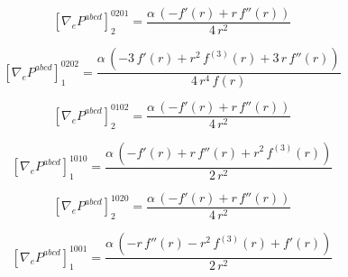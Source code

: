 \documentclass[11pt]{article}
\begin{document}
\begin{dmath*}[breakdepth={5}]
\left[\nabla_e P^{abcd}\right]_{2}^{0201} = \frac{\alpha\,\left(-f'\!\left(r\right) + r\,f''\!\left(r\right)\right)}{4\,{r}^{2}}
\end{dmath*}
\par\smallskip
\begin{dmath*}[breakdepth={5}]
\left[\nabla_e P^{abcd}\right]_{1}^{0202} = \frac{\alpha\,\left(-3\,f'\!\left(r\right) + {r}^{2}\,f^{(3)}\!\left(r\right) + 3\,r\,f''\!\left(r\right)\right)}{4\,{r}^{4}\,f\!\left(r\right)}
\end{dmath*}
\par\smallskip
\begin{dmath*}[breakdepth={5}]
\left[\nabla_e P^{abcd}\right]_{2}^{0102} = \frac{\alpha\,\left(-f'\!\left(r\right) + r\,f''\!\left(r\right)\right)}{4\,{r}^{2}}
\end{dmath*}
\par\smallskip
\begin{dmath*}[breakdepth={5}]
\left[\nabla_e P^{abcd}\right]_{1}^{1010} = \frac{\alpha\,\left(-f'\!\left(r\right) + r\,f''\!\left(r\right) + {r}^{2}\,f^{(3)}\!\left(r\right)\right)}{2\,{r}^{2}}
\end{dmath*}
\par\smallskip
\begin{dmath*}[breakdepth={5}]
\left[\nabla_e P^{abcd}\right]_{2}^{1020} = \frac{\alpha\,\left(-f'\!\left(r\right) + r\,f''\!\left(r\right)\right)}{4\,{r}^{2}}
\end{dmath*}
\par\smallskip
\begin{dmath*}[breakdepth={5}]
\left[\nabla_e P^{abcd}\right]_{1}^{1001} = \frac{\alpha\,\left(-r\,f''\!\left(r\right) - {r}^{2}\,f^{(3)}\!\left(r\right) + f'\!\left(r\right)\right)}{2\,{r}^{2}}
\end{dmath*}
\end{document}
